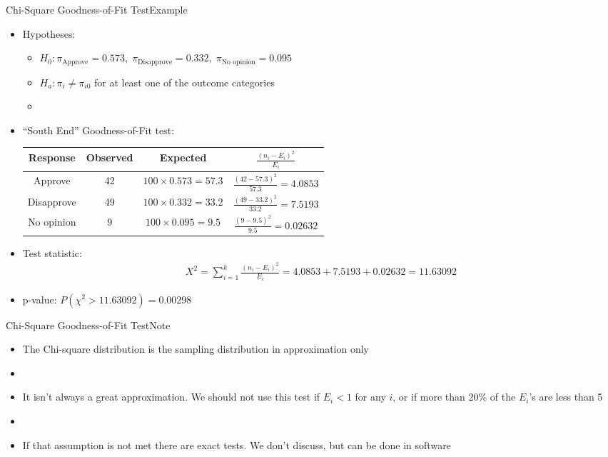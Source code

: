 \documentclass[xcolor=dvipsnames]{beamer}
\begin{document}
\begin{frame}{Chi-Square Goodness-of-Fit Test}{Example}
\begin{itemize}
	\item Hypotheses: \pause
	\begin{itemize}
		\item $H_0: \pi_{\text{Approve}} = 0.573,\; \pi_{\text{Disapprove}} = 0.332,\; \pi_{\text{No opinion}}=0.095$
		\item $H_a: \pi_i \neq \pi_{i0}$ for at least one of the outcome categories  \pause
		\item[]
	\end{itemize}
	\item ``South End'' Goodness-of-Fit test:  \pause
	{\scriptsize
		\begin{center}
			\begin{tabular}{cccc}
				\hline
				Response & Observed & Expected & $\frac{(n_i-E_i)^2}{E_i}$ \\ \hline \hline
				Approve & 42 & $100 \times 0.573 = 57.3$ & $\frac{(42-57.3)^2}{57.3} = 4.0853$\\
				Disapprove & 49 & $100 \times 0.332 = 33.2$ & $\frac{(49-33.2)^2}{33.2} = 7.5193$\\
				No opinion & 9 & $100 \times 0.095 = 9.5$ & $\frac{(9-9.5)^2}{9.5}=0.02632$\\ \hline
			\end{tabular}
	\end{center}}  \pause
	\vspace{1mm}
	\item Test statistic:  \pause
	\begin{gather*}
	X^2 = \sum_{i=1}^k \frac{(n_i-E_i)^2}{E_i} = 4.0853 + 7.5193 + 0.02632 = 11.63092
	\end{gather*} \pause
	\item p-value: $P(\chi^2 > 11.63092) = 0.00298$
\end{itemize}
\end{frame}

\begin{frame}{Chi-Square Goodness-of-Fit Test}{Note}
	\begin{itemize}
		\item The Chi-square distribution is the sampling distribution in approximation only  \pause
		\item[]
		\item It isn't always a great approximation. We should not use this test if $E_i <1$ for any $i$, or if more than 20\% of the $E_i$'s are less than 5  \pause
		\item[]
		\item If that assumption is not met there are exact tests. We don't discuss, but can be done in software
	\end{itemize}
\end{frame}
\end{document}
